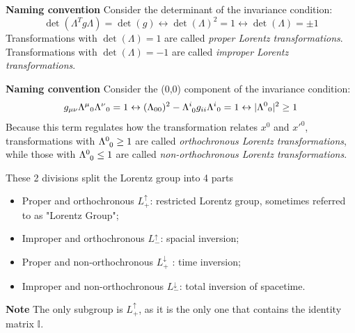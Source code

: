 \textbf{Naming convention} Consider the determinant of the invariance condition:
$$\det(\Lambda^Tg\Lambda)=\det(g)\leftrightarrow\det(\Lambda)^2=1\leftrightarrow\det(\Lambda)=\pm1$$
Transformations with $\det(\Lambda) = 1$ are called \textit{proper Lorentz transformations}.\\
Transformations with $\det(\Lambda)=-1$ are called \textit{improper Lorentz transformations}.

\textbf{Naming convention} Consider the (0,0) component of the invariance condition:
$$g_{\mu\nu}{\Lambda^\mu}_0{\Lambda^\nu}_0 = 1 \leftrightarrow (\Lambda_{00})^2 - \Lambda\indices{^i_0}
g_{ii}{\Lambda^i}_0=1\leftrightarrow |{\Lambda^0}_{0}|^2\geq1$$
Because this term regulates how the transformation relates $x^0$ and $x'^0$,
transformations with $\Lambda\indices{^0_0}\geq1$ are called
\textit{orthochronous Lorentz transformations}, while those with $\Lambda\indices{^0_0}\leq1$ are
called \textit{non-orthochronous Lorentz transformations}.

These 2 divisions split the Lorentz group into 4 parts
\begin{itemize}
    \item Proper and orthochronous $L^{\uparrow}_{+}$: restricted Lorentz group, sometimes referred to
	as "Lorentz Group";
    \item Improper and orthochronous $L^{\uparrow}_-$: spacial inversion;
    \item Proper and non-orthochronous $L^{\downarrow}_+$ : time inversion;
    \item Improper and non-orthochronous $L^{\downarrow}_-$: total inversion of spacetime.
\end{itemize}
\textbf{Note} The only subgroup is $L^\uparrow_+$, as it is the only one that contains the identity
matrix $\mathbb{I}$.
